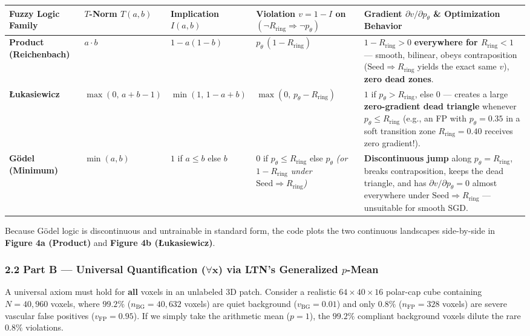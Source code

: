\documentclass[10pt,a4paper]{article}
\renewcommand{\_}{\origunderscore\allowbreak}
\begin{document}
\vspace{0.3em}
{\footnotesize
\setlength{\tabcolsep}{4pt}
\renewcommand{\arraystretch}{1.24}
\begin{tabularx}{\textwidth}{L{2.75cm} L{2.25cm} L{2.45cm} L{3.05cm} Y}
\toprule
{}\textbf{Fuzzy Logic Family} & \textbf{$T$-Norm $T(a, b)$} & \textbf{Implication $I(a, b)$} & \textbf{Violation $v = 1 - I$ on $(\neg R_{\text{ring}} \Rightarrow \neg p_\theta)$} & \textbf{Gradient $\partial v / \partial p_\theta$ \& Optimization Behavior} \\
\midrule
\textbf{Product (Reichenbach)} & $a \cdot b$ & $1 - a(1 - b)$ & $p_\theta\,(1 - R_{\text{ring}})$ & $1 - R_{\text{ring}} > 0$ \textbf{everywhere for $R_{\text{ring}} < 1$} --- smooth, bilinear, obeys contraposition ($\text{Seed} \Rightarrow R_{\text{ring}}$ yields the exact same $v$), \textbf{zero dead zones}. \\
\textbf{\L{}ukasiewicz} & $\max(0,\, a + b - 1)$ & $\min(1,\, 1 - a + b)$ & $\max(0,\, p_\theta - R_{\text{ring}})$ & $1$ if $p_\theta > R_{\text{ring}}$, else \textbf{$0$} --- creates a large \textbf{zero-gradient dead triangle} whenever $p_\theta \le R_{\text{ring}}$ (e.g., an FP with $p_\theta = 0.35$ in a soft transition zone $R_{\text{ring}} = 0.40$ receives zero gradient!). \\
\textbf{G\"odel (Minimum)} & $\min(a, b)$ & $1$ if $a \le b$ else $b$ & $0$ if $p_\theta \le R_{\text{ring}}$ else $p_\theta$ \textit{(or $1 - R_{\text{ring}}$ under $\text{Seed} \Rightarrow R_{\text{ring}}$)} & \textbf{Discontinuous jump} along $p_\theta = R_{\text{ring}}$, breaks contraposition, keeps the dead triangle, and has $\partial v / \partial p_\theta = 0$ almost everywhere under $\text{Seed} \Rightarrow R_{\text{ring}}$ --- unsuitable for smooth SGD. \\
\bottomrule
\end{tabularx}
}
\vspace{0.3em}

Because G\"odel logic is discontinuous and untrainable in standard form, the code plots the two continuous landscapes side-by-side in \textbf{Figure 4a (Product)} and \textbf{Figure 4b (\L{}ukasiewicz)}.

\subsubsection*{2.2 Part B --- Universal Quantification ($\forall \mathbf{x}$) via LTN's Generalized $p$-Mean}
A universal axiom must hold for \textbf{all} voxels in an unlabeled 3D patch. Consider a realistic $64 \times 40 \times 16$ polar-cap cube containing $N = 40{,}960$ voxels, where \textbf{$99.2\%$} ($n_{\text{BG}} = 40{,}632$ voxels) are quiet background ($v_{\text{BG}} = 0.01$) and only \textbf{$0.8\%$} ($n_{\text{FP}} = 328$ voxels) are severe vascular false positives ($v_{\text{FP}} = 0.95$). If we simply take the arithmetic mean ($p = 1$), the $99.2\%$ compliant background voxels dilute the rare $0.8\%$ violations.
\end{document}
